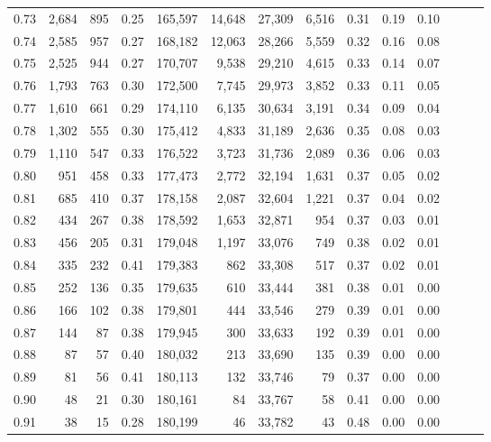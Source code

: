 \begin{tabular}{rrrrrrrrrrrrrr}
0.73 &  2,684 &    895 &  0.25 &  165,597 &   14,648 &  27,309 &   6,516 &  0.31 &  0.19 &      0.10 \\
0.74 &  2,585 &    957 &  0.27 &  168,182 &   12,063 &  28,266 &   5,559 &  0.32 &  0.16 &      0.08 \\
0.75 &  2,525 &    944 &  0.27 &  170,707 &    9,538 &  29,210 &   4,615 &  0.33 &  0.14 &      0.07 \\
0.76 &  1,793 &    763 &  0.30 &  172,500 &    7,745 &  29,973 &   3,852 &  0.33 &  0.11 &      0.05 \\
0.77 &  1,610 &    661 &  0.29 &  174,110 &    6,135 &  30,634 &   3,191 &  0.34 &  0.09 &      0.04 \\
0.78 &  1,302 &    555 &  0.30 &  175,412 &    4,833 &  31,189 &   2,636 &  0.35 &  0.08 &      0.03 \\
0.79 &  1,110 &    547 &  0.33 &  176,522 &    3,723 &  31,736 &   2,089 &  0.36 &  0.06 &      0.03 \\
0.80 &    951 &    458 &  0.33 &  177,473 &    2,772 &  32,194 &   1,631 &  0.37 &  0.05 &      0.02 \\
0.81 &    685 &    410 &  0.37 &  178,158 &    2,087 &  32,604 &   1,221 &  0.37 &  0.04 &      0.02 \\
0.82 &    434 &    267 &  0.38 &  178,592 &    1,653 &  32,871 &     954 &  0.37 &  0.03 &      0.01 \\
0.83 &    456 &    205 &  0.31 &  179,048 &    1,197 &  33,076 &     749 &  0.38 &  0.02 &      0.01 \\
0.84 &    335 &    232 &  0.41 &  179,383 &      862 &  33,308 &     517 &  0.37 &  0.02 &      0.01 \\
0.85 &    252 &    136 &  0.35 &  179,635 &      610 &  33,444 &     381 &  0.38 &  0.01 &      0.00 \\
0.86 &    166 &    102 &  0.38 &  179,801 &      444 &  33,546 &     279 &  0.39 &  0.01 &      0.00 \\
0.87 &    144 &     87 &  0.38 &  179,945 &      300 &  33,633 &     192 &  0.39 &  0.01 &      0.00 \\
0.88 &     87 &     57 &  0.40 &  180,032 &      213 &  33,690 &     135 &  0.39 &  0.00 &      0.00 \\
0.89 &     81 &     56 &  0.41 &  180,113 &      132 &  33,746 &      79 &  0.37 &  0.00 &      0.00 \\
0.90 &     48 &     21 &  0.30 &  180,161 &       84 &  33,767 &      58 &  0.41 &  0.00 &      0.00 \\
0.91 &     38 &     15 &  0.28 &  180,199 &       46 &  33,782 &      43 &  0.48 &  0.00 &      0.00 \\

\end{tabular}
